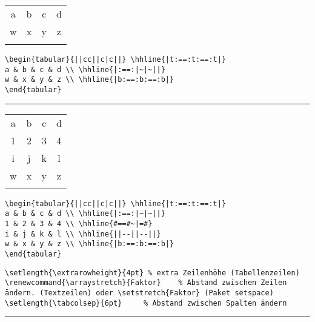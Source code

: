 

\noindent\begin{minipage}{\linewidth}
\Centering
\begin{tabular}{||cc||c|c||} \hhline{|t:==:t:==:t|}
a & b & c & d \\ \hhline{|:==:|~|~||}
w & x & y & z \\ \hhline{|b:==:b:==:b|}
\end{tabular}
\end{minipage}
%
\begin{lstlisting}
\begin{tabular}{||cc||c|c||} \hhline{|t:==:t:==:t|}
a & b & c & d \\ \hhline{|:==:|~|~||}
w & x & y & z \\ \hhline{|b:==:b:==:b|}
\end{tabular}
\end{lstlisting}
%
\hrule
%
\posAbstand

\noindent\begin{minipage}{\linewidth}
\Centering
\begin{tabular}{||cc||c|c||} \hhline{|t:==:t:==:t|}
a & b & c & d \\\hhline{|:==:|~|~||}
1 & 2 & 3 & 4 \\\hhline{#==#~|=#}
i & j & k & l \\\hhline{||--||--||}
w & x & y & z \\\hhline{|b:==:b:==:b|}
\end{tabular}
\end{minipage}
%
\begin{lstlisting}
\begin{tabular}{||cc||c|c||} \hhline{|t:==:t:==:t|}
a & b & c & d \\ \hhline{|:==:|~|~||}
1 & 2 & 3 & 4 \\ \hhline{#==#~|=#}
i & j & k & l \\ \hhline{||--||--||}
w & x & y & z \\ \hhline{|b:==:b:==:b|}
\end{tabular}
\end{lstlisting}
%


\negAbstand

\negAbstand
\begin{lstlisting}
\setlength{\extrarowheight}{4pt} % extra Zeilenhöhe (Tabellenzeilen) 
\renewcommand{\arraystretch}{Faktor}	% Abstand zwischen Zeilen ändern. (Textzeilen) oder \setstretch{Faktor} (Paket setspace)
\setlength{\tabcolsep}{6pt}		% Abstand zwischen Spalten ändern
\end{lstlisting}
\negAbstand
\hrule \vspace{0.5\baselineskip}
